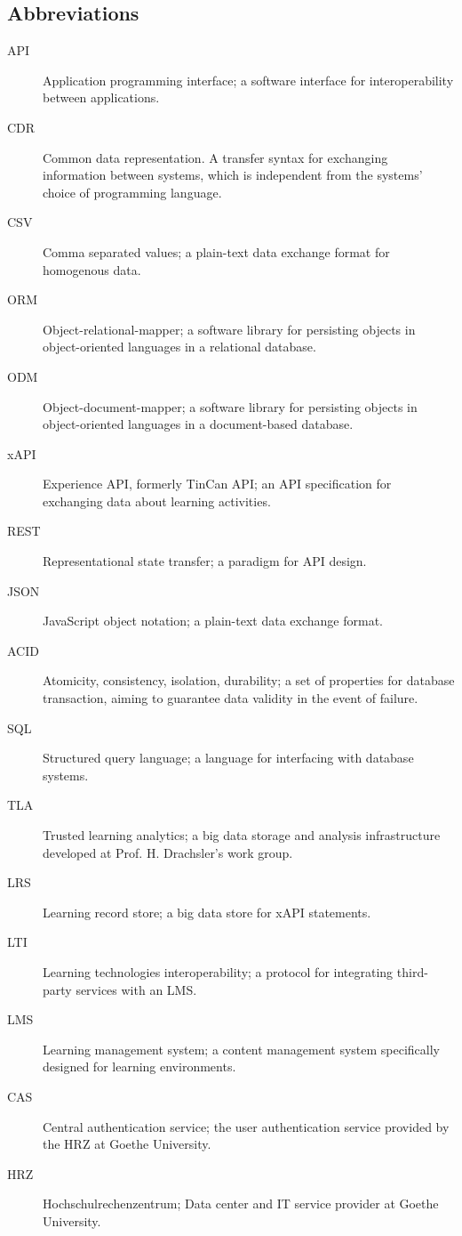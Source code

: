\subsection{Abbreviations}
    \begin{description}
        \item[API] Application programming interface; a software interface for
        interoperability between applications.
        \item[CDR] Common data representation. A transfer syntax for exchanging information
        between systems, which is independent from the systems' choice
        of programming language.
        \item[CSV] Comma separated values; a plain-text data exchange format for homogenous
        data.
        \item[ORM] Object-relational-mapper; a software library for persisting objects
        in object-oriented languages in a relational database.
        \item[ODM] Object-document-mapper; a software library for persisting objects
        in object-oriented languages in a document-based database.
        \item[xAPI] Experience API, formerly TinCan API; an API specification for
        exchanging data about learning activities.
        \item[REST] Representational state transfer; a paradigm for API design.
        \item[JSON] JavaScript object notation; a plain-text data exchange format.
        \item[ACID] Atomicity, consistency, isolation, durability; a set of properties
        for database transaction, aiming to guarantee data validity in the event of failure.
        \item[SQL] Structured query language; a language for interfacing with database systems.
        \item[TLA] Trusted learning analytics; a big data storage and analysis infrastructure
        developed at Prof. H. Drachsler's work group.
        \item[LRS] Learning record store; a big data store for xAPI statements.
        \item[LTI] Learning technologies interoperability; a protocol for integrating third-party
        services with an LMS.
        \item[LMS] Learning management system; a content management system specifically
        designed for learning environments.
        \item[CAS] Central authentication service; the user authentication service provided
        by the HRZ at Goethe University.
        \item[HRZ] Hochschulrechenzentrum; Data center and IT service provider at Goethe University.
    \end{description}